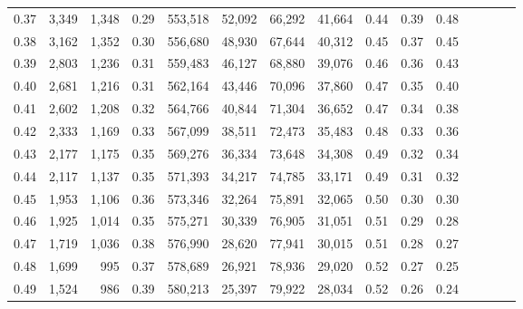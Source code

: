 \begin{tabular}{rrrcrrrrrrrrrrr}
0.37 &   3,349 &  1,348 &                                       0.29 &  553,518 &   52,092 &   66,292 &   41,664 &  0.44 &  0.39 &                         0.48 \\
0.38 &   3,162 &  1,352 &                                       0.30 &  556,680 &   48,930 &   67,644 &   40,312 &  0.45 &  0.37 &                         0.45 \\
0.39 &   2,803 &  1,236 &                                       0.31 &  559,483 &   46,127 &   68,880 &   39,076 &  0.46 &  0.36 &                         0.43 \\
0.40 &   2,681 &  1,216 &                                       0.31 &  562,164 &   43,446 &   70,096 &   37,860 &  0.47 &  0.35 &                         0.40 \\
0.41 &   2,602 &  1,208 &                                       0.32 &  564,766 &   40,844 &   71,304 &   36,652 &  0.47 &  0.34 &                         0.38 \\
0.42 &   2,333 &  1,169 &                                       0.33 &  567,099 &   38,511 &   72,473 &   35,483 &  0.48 &  0.33 &                         0.36 \\
0.43 &   2,177 &  1,175 &                                       0.35 &  569,276 &   36,334 &   73,648 &   34,308 &  0.49 &  0.32 &                         0.34 \\
0.44 &   2,117 &  1,137 &                                       0.35 &  571,393 &   34,217 &   74,785 &   33,171 &  0.49 &  0.31 &                         0.32 \\
0.45 &   1,953 &  1,106 &                                       0.36 &  573,346 &   32,264 &   75,891 &   32,065 &  0.50 &  0.30 &                         0.30 \\
0.46 &   1,925 &  1,014 &                                       0.35 &  575,271 &   30,339 &   76,905 &   31,051 &  0.51 &  0.29 &                         0.28 \\
0.47 &   1,719 &  1,036 &                                       0.38 &  576,990 &   28,620 &   77,941 &   30,015 &  0.51 &  0.28 &                         0.27 \\
0.48 &   1,699 &    995 &                                       0.37 &  578,689 &   26,921 &   78,936 &   29,020 &  0.52 &  0.27 &                         0.25 \\
0.49 &   1,524 &    986 &                                       0.39 &  580,213 &   25,397 &   79,922 &   28,034 &  0.52 &  0.26 &                         0.24 \\

\end{tabular}
